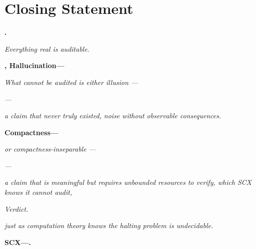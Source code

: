 \documentclass[12pt,a4paper]{article}
\theoremstyle{plain}
\theoremstyle{definition}
\theoremstyle{remark}
\begin{document}
\section*{}
\section*{Closing Statement}
\vspace{12pt}
\begin{center}
\large\textbf{.}
\end{center}
\begin{center}
\large\textit{Everything real is auditable.}
\end{center}
\vspace{18pt}
\begin{center}
\large\textbf{, Hallucination---}
\end{center}
\begin{center}
\large\textit{What cannot be audited is either illusion ---}
\end{center}
\vspace{6pt}
\begin{center}
\textit{---}
\end{center}
\begin{center}
\textit{a claim that never truly existed, noise without observable consequences.}
\end{center}
\vspace{18pt}
\begin{center}
\large\textbf{Compactness---}
\end{center}
\begin{center}
\large\textit{or compactness-inseparable ---}
\end{center}
\vspace{6pt}
\begin{center}
\textit{---}
\end{center}
\begin{center}
\textit{a claim that is meaningful but requires unbounded resources to verify, which SCX knows it cannot audit,}
\end{center}
\vspace{6pt}
\begin{center}
\textit{Verdict.}
\end{center}
\begin{center}
\textit{just as computation theory knows the halting problem is undecidable.}
\end{center}
\vspace{18pt}
\begin{center}
\large\textbf{SCX---.}
\end{center}
\end{document}
